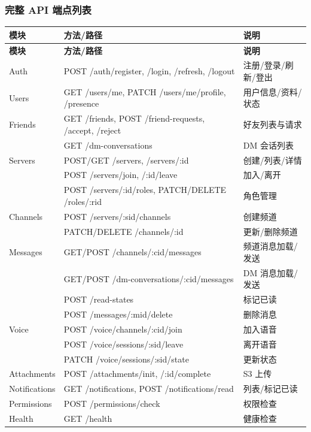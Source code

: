 \subsubsection{完整 API 端点列表}
\par\medskip
{}
\begin{longtable}{p{2.8cm}p{4cm}p{5.5cm}}
\toprule
\textbf{模块} & \textbf{方法/路径} & \textbf{说明} \\
\midrule
\endfirsthead
\toprule
\textbf{模块} & \textbf{方法/路径} & \textbf{说明} \\
\midrule
\endhead
Auth & POST /auth/register, /login, /refresh, /logout & 注册/登录/刷新/登出 \\
Users & GET /users/me, PATCH /users/me/profile, /presence & 用户信息/资料/状态 \\
Friends & GET /friends, POST /friend-requests, /accept, /reject & 好友列表与请求 \\
        & GET /dm-conversations & DM 会话列表 \\
Servers & POST/GET /servers, /servers/:id & 创建/列表/详情 \\
        & POST /servers/join, /:id/leave & 加入/离开 \\
        & POST /servers/:id/roles, PATCH/DELETE /roles/:rid & 角色管理 \\
Channels & POST /servers/:sid/channels & 创建频道 \\
         & PATCH/DELETE /channels/:id & 更新/删除频道 \\
Messages & GET/POST /channels/:cid/messages & 频道消息加载/发送 \\
         & GET/POST /dm-conversations/:cid/messages & DM 消息加载/发送 \\
         & POST /read-states & 标记已读 \\
         & POST /messages/:mid/delete & 删除消息 \\
Voice & POST /voice/channels/:cid/join & 加入语音 \\
      & POST /voice/sessions/:sid/leave & 离开语音 \\
      & PATCH /voice/sessions/:sid/state & 更新状态 \\
Attachments & POST /attachments/init, /:id/complete & S3 上传 \\
Notifications & GET /notifications, POST /notifications/read & 列表/标记已读 \\
Permissions & POST /permissions/check & 权限检查 \\
Health & GET /health & 健康检查 \\
\bottomrule
\end{longtable}
\medskip

